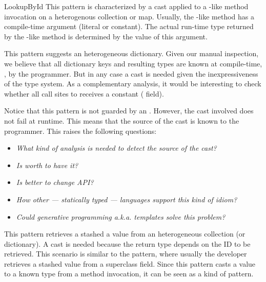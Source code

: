 \begin{pattern}{LookupById}
\detection{}
This pattern is characterized by a cast applied to a -like method invocation on a heterogenous collection or map.
Usually, the -like method has a compile-time argument (literal or constant).
The actual run-time type returned by the -like method is determined by the value of this argument.

\discussion{}
%
%
This pattern suggests an heterogeneous dictionary.
Given our manual inspection,
we believe that all dictionary keys and resulting types are known at
compile-time, \ie, by the programmer.
%
%
But in any case a cast is needed given the inexpressiveness of the type system.
As a complementary analysis,
it would be interesting to check whether all call sites to
 receives a constant ( field).

Notice that this pattern is not guarded by an .
However, the cast involved does not fail at runtime.
This means that the source of the cast is known to the programmer.
This raises the following questions:
\begin{itemize}
\item \emph{What kind of analysis is needed to detect the source of the cast?}
\item \emph{Is worth to have it?}
\item \emph{Is better to change API?}
\item \emph{How other --- statically typed --- languages support this kind of idiom?}
\item \emph{Could generative programming a.k.a. templates solve this problem?}
\end{itemize}

\related{}
This pattern retrieves a stashed a value from an heterogeneous collection (or dictionary).
A cast is needed because the return type depends on the ID to be retrieved.
This scenario is similar to the  pattern,
where usually the developer retrieves a stashed value from a superclass field.
Since this pattern casts a value to a known type from a method invocation,
it can be seen as a kind of  pattern.

\end{pattern}